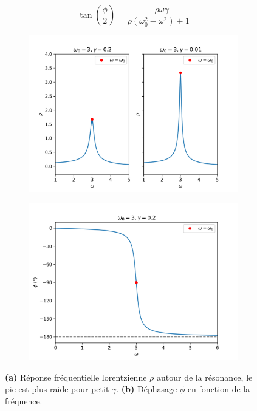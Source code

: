 \begin{dmath}
    \tan(\frac{\phi}{2}) = \frac{-\rho\omega\gamma}{\rho(\omega_0^2 - \omega^2) + 1}
\end{dmath}
%
\begin{figure}[!t]
    \centering
    \begin{subfigure}[b]{0.45\textwidth}
        \centering
        \includegraphics[width=\textwidth]{images/harmonique/rho_plot_contrast.png}
        \caption{}
        \label{fig:lorentzian}
    \end{subfigure}  
    \begin{subfigure}[b]{0.45\textwidth}
        \centering
        \includegraphics[width=\textwidth]{images/harmonique/frequency_phase_shift.png}
        \caption{}
        \label{fig:phase_shift}
    \end{subfigure}  
    \caption{\textbf{(a)} Réponse fréquentielle lorentzienne $\rho$ autour de la résonance, le pic est plus raide pour petit $\gamma$. \textbf{(b)} Déphasage $\phi$ en fonction de la fréquence.}
\end{figure}
